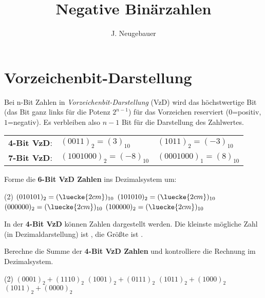 \documentclass[9pt, a4paper]{scrartcl}
\author{J. Neugebauer}
\title{Negative Binärzahlen}
\date{\Heute}
\begin{document}
\ReiheTitel

\section*{Vorzeichenbit-Darstellung}
\begin{infobox}
Bei n-Bit Zahlen in \emph{Vorzeichenbit-Darstellung} (VzD) wird das höchstwertige Bit (das Bit ganz links für die Potenz $2^{n-1}$) für das Vorzeichen reserviert ($0$=positiv, $1$=negativ). Es verbleiben also $n-1$ Bit für die Darstellung des Zahlwertes.

\begin{tabularx}{\textwidth}{XXX}
	\textbf{4-Bit VzD}: & $(0011)_2 = (3)_{10}$ & $(1011)_2 = (-3)_{10}$ \\
	\textbf{7-Bit VzD}: & $(1001000)_2 = (-8)_{10}$ & $(0001000)_1 = (8)_{10}$
\end{tabularx}
\end{infobox}

\begin{aufgabe}
	Forme die \textbf{6-Bit VzD Zahlen} ins Dezimalsystem um:
	
	\begin{tasks}(2)
		\task $(010101)_2 = (\luecke{2cm})_{10}$
		\task $(101010)_2 = (\luecke{2cm})_{10}$
		\task $(000000)_2 = (\luecke{2cm})_{10}$
		\task $(100000)_2 = (\luecke{2cm})_{10}$
	\end{tasks}
\end{aufgabe}

\begin{aufgabe}
	In der \textbf{4-Bit VzD} können \luecke{2cm} Zahlen dargestellt werden. Die kleinste mögliche Zahl (in Dezimaldarstellung) ist \luecke{2cm}, die Größte ist \luecke{2cm}.
\end{aufgabe}

\begin{aufgabe}
	Berechne die Summe der \textbf{4-Bit VzD Zahlen} und kontrolliere die Rechnung im Dezimalsystem.
	
	\begin{tasks}(2)
		\task $(0001)_2 + (1110)_2$
		\task $(1001)_2 + (0111)_2$
		\task $(1011)_2 + (1000)_2$
		\task $(1011)_2 + (0000)_2$
	\end{tasks}
\end{aufgabe}
\end{document}

